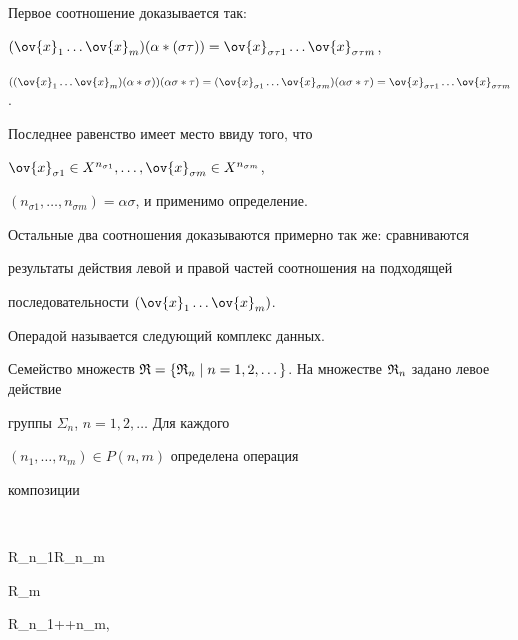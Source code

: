 \begin{pf}


Первое соотношение доказывается так:





$(\ov{x}_1 \dotsc \ov{x}_m)(\alpha * (\sigma \tau))=


\ov{x}_{\sigma\tau 1} \dotsc \ov{x}_{\sigma\tau m}$,





$((\ov{x}_{ 1} \dotsc \ov{x}_{ m})(\alpha * \sigma))(\alpha\sigma * \tau)=


(\ov{x}_{\sigma 1} \dotsc \ov{x}_{\sigma m})(\alpha\sigma * \tau)=


\ov{x}_{\sigma\tau 1} \dotsc \ov{x}_{\sigma\tau m}$.





\noindent{}Последнее равенство имеет место ввиду того, что


$\ov{x}_{\sigma 1}\in X^{n_{\sigma 1}},\dotsc,


\ov{x}_{\sigma m}\in X^{n_{\sigma m}}$,


$(n_{\sigma 1},\dotsc,n_{\sigma m})=\alpha\sigma$, и применимо определение.


Остальные два соотношения доказываются примерно так же: сравниваются


результаты действия левой и правой частей соотношения на подходящей


последовательности $(\ov{x}_{ 1} \dotsc \ov{x}_{ m})$.


\end{pf}





Операдой называется следующий комплекс данных.


Семейство множеств $\frak R=\{\frak R_n\mid


n=1,2,\dotsc \}$. На множестве $\frak R_n$ задано левое действие


группы $\Sigma_n$, $n=1,2,\dotsc$ Для каждого


$(n_1,\dotsc,n_m)\in P(n,m)$ определена операция


композиции


$$


\frak R_{n_1}\times \dotsb \times \frak R_{n_m}\times


\frak R_m \longrightarrow


\frak R_{n_1+\dotsb +n_m},\ \;


